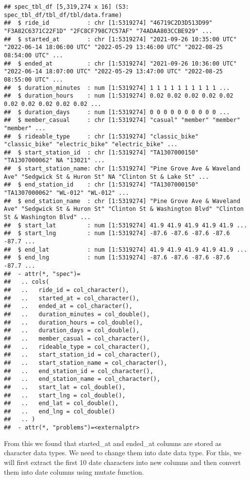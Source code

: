 \documentclass[
]{article}
\begin{document}
\begin{verbatim}
## spec_tbl_df [5,319,274 x 16] (S3: spec_tbl_df/tbl_df/tbl/data.frame)
##  $ ride_id           : chr [1:5319274] "46719C2D3D513D99" "F3A82C6371C22F1D" "2FC8CF798C7C57AF" "74ADAA803CCBE929" ...
##  $ started_at        : chr [1:5319274] "2021-09-26 10:35:00 UTC" "2022-06-14 18:06:00 UTC" "2022-05-29 13:46:00 UTC" "2022-08-25 08:54:00 UTC" ...
##  $ ended_at          : chr [1:5319274] "2021-09-26 10:36:00 UTC" "2022-06-14 18:07:00 UTC" "2022-05-29 13:47:00 UTC" "2022-08-25 08:55:00 UTC" ...
##  $ duration_minutes  : num [1:5319274] 1 1 1 1 1 1 1 1 1 1 ...
##  $ duration_hours    : num [1:5319274] 0.02 0.02 0.02 0.02 0.02 0.02 0.02 0.02 0.02 0.02 ...
##  $ duration_days     : num [1:5319274] 0 0 0 0 0 0 0 0 0 0 ...
##  $ member_casual     : chr [1:5319274] "casual" "member" "member" "member" ...
##  $ rideable_type     : chr [1:5319274] "classic_bike" "classic_bike" "electric_bike" "electric_bike" ...
##  $ start_station_id  : chr [1:5319274] "TA1307000150" "TA1307000062" NA "13021" ...
##  $ start_station_name: chr [1:5319274] "Pine Grove Ave & Waveland Ave" "Sedgwick St & Huron St" NA "Clinton St & Lake St" ...
##  $ end_station_id    : chr [1:5319274] "TA1307000150" "TA1307000062" "WL-012" "WL-012" ...
##  $ end_station_name  : chr [1:5319274] "Pine Grove Ave & Waveland Ave" "Sedgwick St & Huron St" "Clinton St & Washington Blvd" "Clinton St & Washington Blvd" ...
##  $ start_lat         : num [1:5319274] 41.9 41.9 41.9 41.9 41.9 ...
##  $ start_lng         : num [1:5319274] -87.6 -87.6 -87.6 -87.6 -87.7 ...
##  $ end_lat           : num [1:5319274] 41.9 41.9 41.9 41.9 41.9 ...
##  $ end_lng           : num [1:5319274] -87.6 -87.6 -87.6 -87.6 -87.7 ...
##  - attr(*, "spec")=
##   .. cols(
##   ..   ride_id = col_character(),
##   ..   started_at = col_character(),
##   ..   ended_at = col_character(),
##   ..   duration_minutes = col_double(),
##   ..   duration_hours = col_double(),
##   ..   duration_days = col_double(),
##   ..   member_casual = col_character(),
##   ..   rideable_type = col_character(),
##   ..   start_station_id = col_character(),
##   ..   start_station_name = col_character(),
##   ..   end_station_id = col_character(),
##   ..   end_station_name = col_character(),
##   ..   start_lat = col_double(),
##   ..   start_lng = col_double(),
##   ..   end_lat = col_double(),
##   ..   end_lng = col_double()
##   .. )
##  - attr(*, "problems")=<externalptr>
\end{verbatim}

From this we found that started\_at and ended\_at columns are stored as
character data types. We need to change them into date data type. For
this, we will first extract the first 10 date characters into new
columns and then convert them into date columns using mutate function.
\end{document}
